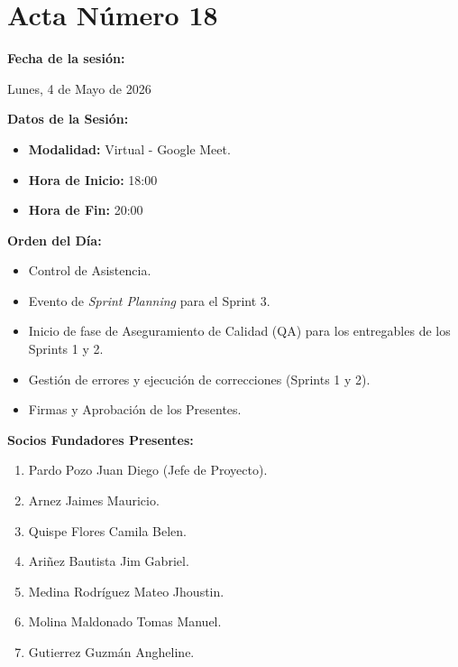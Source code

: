 \newpage
\section{Acta Número 18}
\label{sec:acta18}

\noindent \textbf{Fecha de la sesión:}\par
Lunes, 4 de Mayo de 2026

\vspace*{0.5cm}
\noindent \textbf{Datos de la Sesión:}
\vspace{-0.2cm}
\begin{itemize}[noitemsep]
    \item \textbf{Modalidad:} Virtual - Google Meet.
    \item \textbf{Hora de Inicio:} 18:00
    \item \textbf{Hora de Fin:} 20:00
\end{itemize}

\vspace*{0.5cm}
\noindent \textbf{Orden del Día:}
\vspace{-0.2cm}
\begin{itemize}[noitemsep]
    \item Control de Asistencia.
    \item Evento de \textit{Sprint Planning} para el Sprint 3.
    \item Inicio de fase de Aseguramiento de Calidad (QA) para los entregables de los Sprints 1 y 2.
    \item Gestión de errores y ejecución de correcciones (Sprints 1 y 2).
    \item Firmas y Aprobación de los Presentes.
\end{itemize}

\vspace*{0.5cm}
\noindent \textbf{Socios Fundadores Presentes:}
\vspace{-0.2cm}
\begin{enumerate}[noitemsep]
    \item Pardo Pozo Juan Diego (Jefe de Proyecto).
    \item Arnez Jaimes Mauricio.
    \item Quispe Flores Camila Belen.
    \item Ariñez Bautista Jim Gabriel.
    \item Medina Rodríguez Mateo Jhoustin.
    \item Molina Maldonado Tomas Manuel.
    \item Gutierrez Guzmán Angheline.
\end{enumerate}

